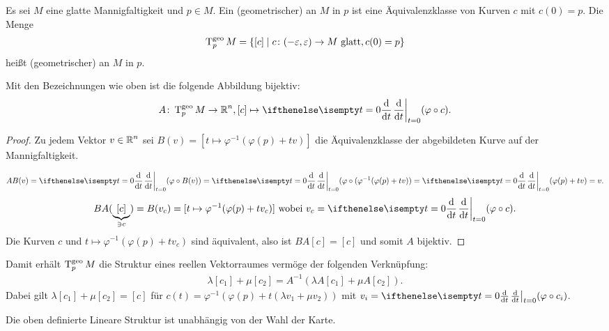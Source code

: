 \begin{dfn}
  Es sei $M$ eine glatte Mannigfaltigkeit und $p \in M$. Ein (geometrischer)  an $M$ in $p$ ist eine Äquivalenzklasse von Kurven $c$ mit $c(0) = p$. Die Menge
  \begin{align*}
    \operatorname{T}_{p}^{\text{geo}}M = \{ [c] \mid c \colon (-\varepsilon,\varepsilon) \to M \text{ glatt}, c(0) = p\}
  \end{align*}
  heißt (geometrischer)  an $M$ in $p$.
\end{dfn}

\begin{bem}
  Mit den Bezeichnungen wie oben ist die folgende Abbildung bijektiv:
  \begin{align*}
    A \colon \T_p^{\text{geo}}M \to \R^n, [c] \mapsto \difffrac[t=0]{}{t}(\varphi \circ c).
  \end{align*}
\end{bem}

\begin{proof}
  Zu jedem Vektor $v \in \operatorname{\mathbb{R}}^n$ sei $B(v) = [t \mapsto \varphi^{-1}(\varphi(p) + tv)]$ die Äquivalenzklasse der abgebildeten Kurve auf der Mannigfaltigkeit.


  \[ A B(v) = \difffrac[t=0]{}{t}(\varphi \circ B(v)) = \difffrac[t=0]{}{t}(\varphi \circ (\varphi^{-1}(\varphi(p) + tv)) = \difffrac[t=0]{}{t}(\varphi(p) + tv) = v. \]
  \[ B A (\underbrace{[c]}_{\ni c}) = B(v_c) = [t \mapsto \varphi^{-1}(\varphi(p) + tv_c)] \text{ wobei } v_c = \difffrac[t=0]{}{t}(\varphi \circ c). \]
  Die Kurven $c$ und $t \mapsto \varphi^{-1}(\varphi(p) + tv_c)$ sind äquivalent, also ist $B A[c] = [c]$ und somit $A$ bijektiv.
\end{proof}

Damit erhält $\operatorname{T}_p^{\text{geo}}M$ die Struktur eines reellen Vektorraumes vermöge der folgenden Verknüpfung:
\begin{align*}
  \lambda[c_1] + \mu[c_2] = A^{-1}(\lambda A[c_1]+ \mu A[c_2]).
\end{align*}
Dabei gilt $\lambda[c_1]+\mu[c_2] = [c]$ für $c(t) = \varphi^{-1}(\varphi(p) + t(\lambda v_1 + \mu v_2))$ mit $v_i = \difffrac[t=0]{}{t}(\varphi \circ c_i)$.

\begin{lemma}
  Die oben definierte Lineare Struktur ist unabhängig von der Wahl der Karte.
\end{lemma}

